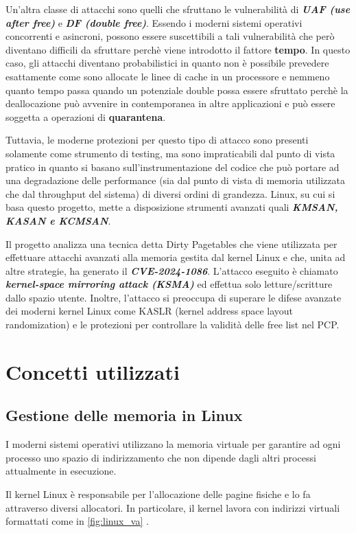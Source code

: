 \documentclass{article}
\begin{document}
Un'altra classe di attacchi sono quelli che sfruttano le vulnerabilità di \textbf{\textit{UAF (use after free)}} e 
\textbf{\textit{DF (double free)}}. Essendo i moderni sistemi operativi
concorrenti e asincroni, possono essere suscettibili a tali vulnerabilità che però diventano 
difficili da sfruttare perchè viene introdotto il fattore \textbf{tempo}. In questo caso, 
gli attacchi diventano probabilistici in quanto non è possibile prevedere esattamente come 
sono allocate le linee di cache in un processore e nemmeno quanto tempo passa quando un
potenziale double possa essere sfruttato perchè la deallocazione può avvenire in 
contemporanea in altre applicazioni e può essere soggetta a operazioni di \textbf{quarantena}. 

Tuttavia, le moderne protezioni per questo tipo di attacco sono presenti solamente come strumento 
di testing, ma sono impraticabili dal punto di vista pratico in quanto si basano sull'instrumentazione 
del codice che può portare ad una degradazione delle performance (sia dal punto di vista 
di memoria utilizzata che dal throughput del sistema) di diversi ordini di grandezza. 
Linux, su cui si basa questo progetto, mette a disposizione strumenti avanzati quali 
\textbf{\textit{KMSAN, KASAN e KCMSAN}}. 

Il progetto analizza una tecnica detta Dirty Pagetables che viene utilizzata per effettuare 
attacchi avanzati alla memoria gestita dal kernel Linux e che, unita ad altre strategie, ha 
generato il \textbf{\textit{CVE-2024-1086}}. L'attacco eseguito è chiamato 
\textbf{\textit{kernel-space mirroring attack (KSMA)}} ed effettua solo letture/scritture 
dallo spazio utente. Inoltre, l'attacco si preoccupa di superare le difese avanzate dei 
moderni kernel Linux come KASLR (kernel address space layout randomization) e le protezioni per 
controllare la validità delle free list nel PCP.

\clearpage
\section{Concetti utilizzati}\label{s:basics}
\subsection{Gestione delle memoria in Linux}
I moderni sistemi operativi utilizzano la memoria virtuale per garantire ad ogni processo 
uno spazio di indirizzamento che non dipende dagli altri processi attualmente in esecuzione. 

Il kernel Linux è responsabile per l'allocazione delle pagine fisiche e lo fa attraverso 
diversi allocatori. In particolare, il kernel lavora con indirizzi virtuali formattati come 
in \cref{fig:linux_va} \cite{LinuxDocs}.
\end{document}
